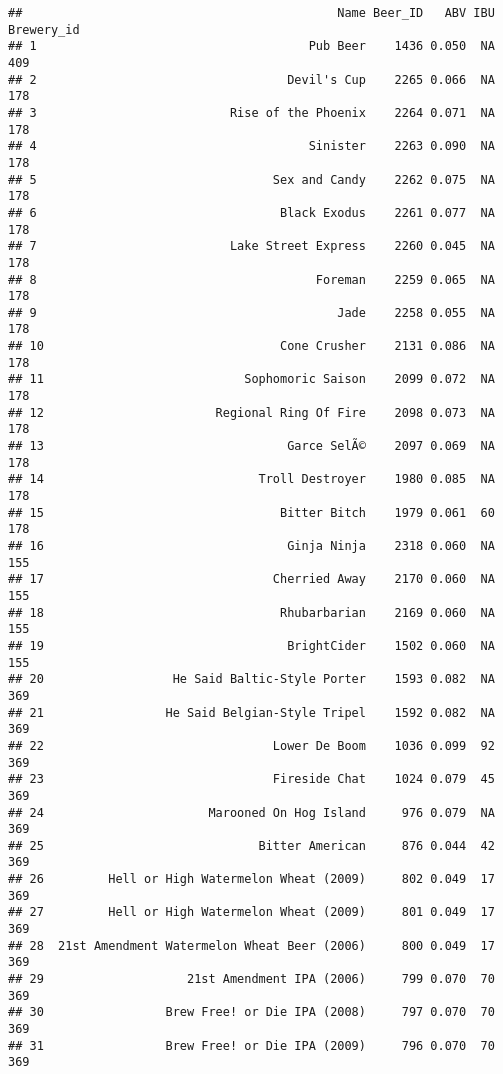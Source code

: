 \documentclass[
]{article}
\begin{document}
\begin{verbatim}
##                                            Name Beer_ID   ABV IBU Brewery_id
## 1                                      Pub Beer    1436 0.050  NA        409
## 2                                   Devil's Cup    2265 0.066  NA        178
## 3                           Rise of the Phoenix    2264 0.071  NA        178
## 4                                      Sinister    2263 0.090  NA        178
## 5                                 Sex and Candy    2262 0.075  NA        178
## 6                                  Black Exodus    2261 0.077  NA        178
## 7                           Lake Street Express    2260 0.045  NA        178
## 8                                       Foreman    2259 0.065  NA        178
## 9                                          Jade    2258 0.055  NA        178
## 10                                 Cone Crusher    2131 0.086  NA        178
## 11                            Sophomoric Saison    2099 0.072  NA        178
## 12                        Regional Ring Of Fire    2098 0.073  NA        178
## 13                                  Garce SelÃ©    2097 0.069  NA        178
## 14                              Troll Destroyer    1980 0.085  NA        178
## 15                                 Bitter Bitch    1979 0.061  60        178
## 16                                  Ginja Ninja    2318 0.060  NA        155
## 17                                Cherried Away    2170 0.060  NA        155
## 18                                 Rhubarbarian    2169 0.060  NA        155
## 19                                  BrightCider    1502 0.060  NA        155
## 20                  He Said Baltic-Style Porter    1593 0.082  NA        369
## 21                 He Said Belgian-Style Tripel    1592 0.082  NA        369
## 22                                Lower De Boom    1036 0.099  92        369
## 23                                Fireside Chat    1024 0.079  45        369
## 24                       Marooned On Hog Island     976 0.079  NA        369
## 25                              Bitter American     876 0.044  42        369
## 26         Hell or High Watermelon Wheat (2009)     802 0.049  17        369
## 27         Hell or High Watermelon Wheat (2009)     801 0.049  17        369
## 28  21st Amendment Watermelon Wheat Beer (2006)     800 0.049  17        369
## 29                    21st Amendment IPA (2006)     799 0.070  70        369
## 30                 Brew Free! or Die IPA (2008)     797 0.070  70        369
## 31                 Brew Free! or Die IPA (2009)     796 0.070  70        369

\end{verbatim}
\end{document}
